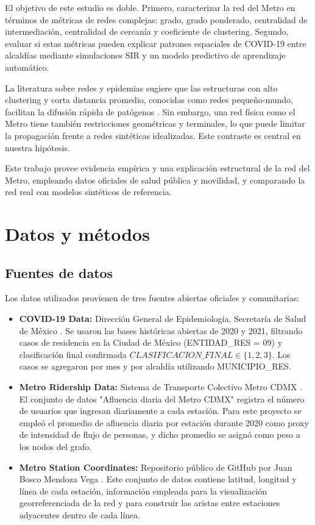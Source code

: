 \documentclass[10pt,twocolumn]{article}
\begin{document}
El objetivo de este estudio es doble. Primero, caracterizar la red del Metro en términos de métricas de redes complejas: grado, grado ponderado, centralidad de intermediación, centralidad de cercanía y coeficiente de clustering. Segundo, evaluar si estas métricas pueden explicar patrones espaciales de COVID-19 entre alcaldías mediante simulaciones SIR y un modelo predictivo de aprendizaje automático.

La literatura sobre redes y epidemias sugiere que las estructuras con alto clustering y corta distancia promedio, conocidas como redes pequeño-mundo, facilitan la difusión rápida de patógenos \citep{watts1998collective}. Sin embargo, una red física como el Metro tiene también restricciones geométricas y terminales, lo que puede limitar la propagación frente a redes sintéticas idealizadas. Este contraste es central en nuestra hipótesis.

Este trabajo provee evidencia empírica y una explicación estructural de la red del Metro, empleando datos oficiales de salud pública y movilidad, y comparando la red real con modelos sintéticos de referencia.

\section{Datos y métodos}
\subsection{Fuentes de datos}
Los datos utilizados provienen de tres fuentes abiertas oficiales y comunitarias:
\begin{itemize}[nosep,leftmargin=*]
    \item \textbf{COVID-19 Data:} Dirección General de Epidemiología, Secretaría de Salud de México \citep{dge2020}. Se usaron las bases históricas abiertas de 2020 y 2021, filtrando casos de residencia en la Ciudad de México (ENTIDAD\_RES = 09) y clasificación final confirmada \(CLASIFICACION\_FINAL \in \{1,2,3\}\). Los casos se agregaron por mes y por alcaldía utilizando MUNICIPIO\_RES.
    \item \textbf{Metro Ridership Data:} Sistema de Transporte Colectivo Metro CDMX \citep{metro2020}. El conjunto de datos "Afluencia diaria del Metro CDMX" registra el número de usuarios que ingresan diariamente a cada estación. Para este proyecto se empleó el promedio de afluencia diaria por estación durante 2020 como proxy de intensidad de flujo de personas, y dicho promedio se asignó como peso a los nodos del grafo.
    \item \textbf{Metro Station Coordinates:} Repositorio público de GitHub por Juan Bosco Mendoza Vega \citep{mendoza2020}. Este conjunto de datos contiene latitud, longitud y línea de cada estación, información empleada para la visualización georreferenciada de la red y para construir las aristas entre estaciones adyacentes dentro de cada línea.
\end{itemize}
\end{document}

